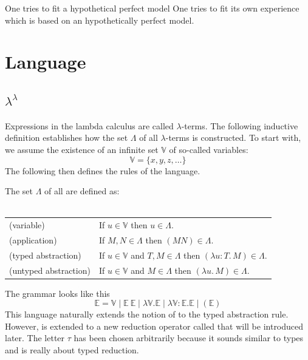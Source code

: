 One tries to fit a hypothetical perfect model
One tries to fit its own experience which is based on an hypothetically perfect model.

\section{Language}

\subsection{\texorpdfstring{$\lambda^\lambda$}{λ^λ}}

Expressions in the lambda calculus are called \(\lambda\)-terms. The following inductive definition establishes how the set \(\Lambda\) of all \(\lambda\)-terms is constructed. To start with, we assume the existence of an infinite set \(\mathbb{V}\) of so-called variables:
\[
    \mathbb{V} = \{ x, y, z, \dots \}
\]
The following then defines the rules of the language.
\begin{definition}The set \(\Lambda\) of all \lterms are defined as:\\\\
\begin{tabular}{ll}
    (variable)              & If \(u \in \mathbb{V}\) then \(u \in \Lambda\). \\
    (application)           & If \(M, N \in \Lambda\) then \((MN) \in \Lambda\).  \\
    (typed abstraction)     & If \(u \in \mathbb{V}\) and \(T, M \in \Lambda\) then \((\lambda u : T .\, M) \in \Lambda\).  \\
    (untyped abstraction)   & If \(u \in \mathbb{V}\) and \(M \in \Lambda\) then \((\lambda u .\, M) \in \Lambda\).
\end{tabular}
\end{definition}

\medskip

\noindent The grammar looks like this
\[
\mathbb{E} = \mathbb{V} \mid \mathbb{E}\ \mathbb{E} \mid \lambda \mathbb{V}.\mathbb{E} \mid \lambda \mathbb{V}\colon\mathbb{E}.\mathbb{E} \mid (\mathbb{E})
\]
This language naturally extends the notion of \alphaequivalence to the typed abstraction rule. However, \betareduction is extended to a new reduction operator called \taureduction that will be introduced later. The letter $\tau$ has been chosen arbitrarily because it sounds similar to types and \taureduction is really about typed reduction.\\

